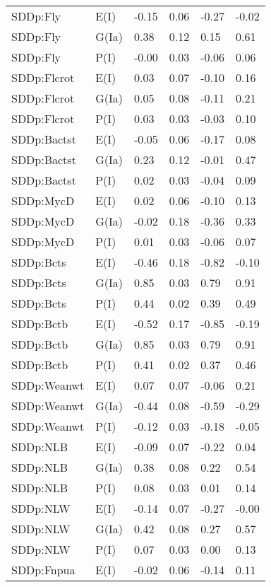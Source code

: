 \begin{center}
\begin{longtable}{|p{1.1in}|p{0.7in}|p{0.7in}|p{0.6in}|p{0.6in}|p{0.6in}|}
  SDDp:Fly & E(I) & -0.15 & 0.06 & -0.27 & -0.02 \\ 
  SDDp:Fly & G(Ia) & 0.38 & 0.12 & 0.15 & 0.61 \\ 
  SDDp:Fly & P(I) & -0.00 & 0.03 & -0.06 & 0.06 \\ 
  SDDp:Flcrot & E(I) & 0.03 & 0.07 & -0.10 & 0.16 \\ 
  SDDp:Flcrot & G(Ia) & 0.05 & 0.08 & -0.11 & 0.21 \\ 
  SDDp:Flcrot & P(I) & 0.03 & 0.03 & -0.03 & 0.10 \\ 
  SDDp:Bactst & E(I) & -0.05 & 0.06 & -0.17 & 0.08 \\ 
  SDDp:Bactst & G(Ia) & 0.23 & 0.12 & -0.01 & 0.47 \\ 
  SDDp:Bactst & P(I) & 0.02 & 0.03 & -0.04 & 0.09 \\ 
  SDDp:MycD & E(I) & 0.02 & 0.06 & -0.10 & 0.13 \\ 
  SDDp:MycD & G(Ia) & -0.02 & 0.18 & -0.36 & 0.33 \\ 
  SDDp:MycD & P(I) & 0.01 & 0.03 & -0.06 & 0.07 \\ 
  SDDp:Bcts & E(I) & -0.46 & 0.18 & -0.82 & -0.10 \\ 
  SDDp:Bcts & G(Ia) & 0.85 & 0.03 & 0.79 & 0.91 \\ 
  SDDp:Bcts & P(I) & 0.44 & 0.02 & 0.39 & 0.49 \\ 
  SDDp:Bctb & E(I) & -0.52 & 0.17 & -0.85 & -0.19 \\ 
  SDDp:Bctb & G(Ia) & 0.85 & 0.03 & 0.79 & 0.91 \\ 
  SDDp:Bctb & P(I) & 0.41 & 0.02 & 0.37 & 0.46 \\ 
  SDDp:Weanwt & E(I) & 0.07 & 0.07 & -0.06 & 0.21 \\ 
  SDDp:Weanwt & G(Ia) & -0.44 & 0.08 & -0.59 & -0.29 \\ 
  SDDp:Weanwt & P(I) & -0.12 & 0.03 & -0.18 & -0.05 \\ 
  SDDp:NLB & E(I) & -0.09 & 0.07 & -0.22 & 0.04 \\ 
  SDDp:NLB & G(Ia) & 0.38 & 0.08 & 0.22 & 0.54 \\ 
  SDDp:NLB & P(I) & 0.08 & 0.03 & 0.01 & 0.14 \\ 
  SDDp:NLW & E(I) & -0.14 & 0.07 & -0.27 & -0.00 \\ 
  SDDp:NLW & G(Ia) & 0.42 & 0.08 & 0.27 & 0.57 \\ 
  SDDp:NLW & P(I) & 0.07 & 0.03 & 0.00 & 0.13 \\ 
  SDDp:Fnpua & E(I) & -0.02 & 0.06 & -0.14 & 0.11 \\ 

\end{longtable}
\end{center}
